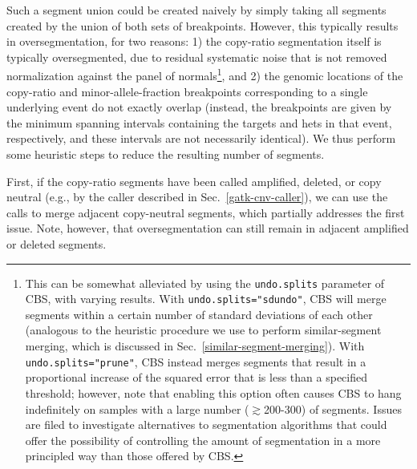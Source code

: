 \documentclass[nofootinbib,amssymb,amsmath]{revtex4}
\begin{document}
Such a segment union could be created naively by simply taking all segments created by the union of both sets of breakpoints.  However, this typically results in oversegmentation, for two reasons: 1) the copy-ratio segmentation itself is typically oversegmented, due to residual systematic noise that is not removed normalization against the panel of normals\footnote{This can be somewhat alleviated by using the \texttt{undo.splits} parameter of CBS, with varying results.  With \texttt{undo.splits="sdundo"}, CBS will merge segments within a certain number of standard deviations of each other (analogous to the heuristic procedure we use to perform similar-segment merging, which is discussed in Sec.~\ref{similar-segment-merging}).  With \texttt{undo.splits="prune"}, CBS instead merges segments that result in a proportional increase of the squared error that is less than a specified threshold; however, note that enabling this option often causes CBS to hang indefinitely on samples with a large number ($\gtrsim$200-300) of segments.  Issues are filed to investigate alternatives to segmentation algorithms that could offer the possibility of controlling the amount of segmentation in a more principled way than those offered by CBS.}, and 2) the genomic locations of the copy-ratio and minor-allele-fraction breakpoints corresponding to a single underlying event do not exactly overlap (instead, the breakpoints are given by the minimum spanning intervals containing the targets and hets in that event, respectively, and these intervals are not necessarily identical).  We thus perform some heuristic steps to reduce the resulting number of segments.

First, if the copy-ratio segments have been called amplified, deleted, or copy neutral (e.g., by the caller described in Sec.~\ref{gatk-cnv-caller}), we can use the calls to merge adjacent copy-neutral segments, which partially addresses the first issue.  Note, however, that oversegmentation can still remain in adjacent amplified or deleted segments.
\end{document}

